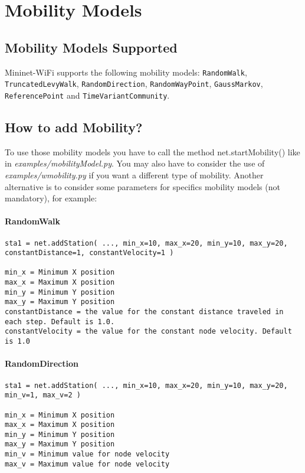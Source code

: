 \chapter{Mobility Models}

\section{Mobility Models Supported}
Mininet-WiFi supports the following mobility models: \texttt{RandomWalk}, \texttt{TruncatedLevyWalk}, \texttt{RandomDirection}, \texttt{RandomWayPoint}, \texttt{GaussMarkov}, \texttt{ReferencePoint} and \texttt{TimeVariantCommunity}.

\section{How to add Mobility?}
To use those mobility models you have to call the method net.startMobility() like in \textit{examples/mobilityModel.py}. You may also have to consider the use of \textit{examples/wmobility.py} if you want a different type of mobility. Another alternative is to consider some parameters for specifics mobility models (not mandatory), for example:

\subsubsection{RandomWalk}

\begin{verbatim}
sta1 = net.addStation( ..., min_x=10, max_x=20, min_y=10, max_y=20, constantDistance=1, constantVelocity=1 )

min_x = Minimum X position
max_x = Maximum X position
min_y = Minimum Y position
max_y = Maximum Y position
constantDistance = the value for the constant distance traveled in each step. Default is 1.0.
constantVelocity = the value for the constant node velocity. Default is 1.0
\end{verbatim}

\subsubsection{RandomDirection}

\begin{verbatim}
sta1 = net.addStation( ..., min_x=10, max_x=20, min_y=10, max_y=20, min_v=1, max_v=2 )

min_x = Minimum X position
max_x = Maximum X position
min_y = Minimum Y position
max_y = Maximum Y position
min_v = Minimum value for node velocity
max_v = Maximum value for node velocity
\end{verbatim}

